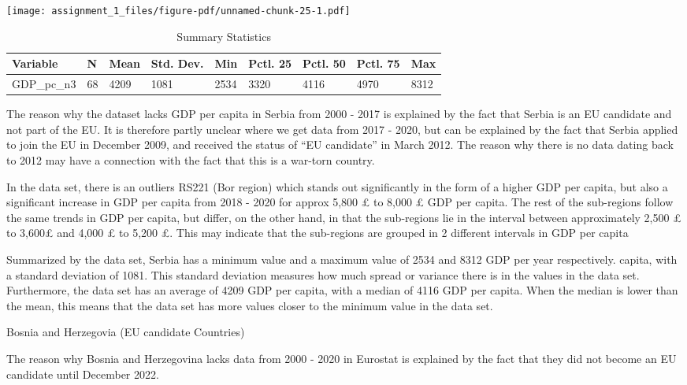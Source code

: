 \documentclass[
  letterpaper,
  DIV=11,
  numbers=noendperiod]{scrartcl}
\begin{document}
\texttt{[image: assignment\_1\_files/figure-pdf/unnamed-chunk-25-1.pdf]}

\begin{table}

\caption{Summary Statistics}
\centering
\begin{tabular}[t]{lllllllll}
\toprule
Variable & N & Mean & Std. Dev. & Min & Pctl. 25 & Pctl. 50 & Pctl. 75 & Max\\
\midrule
GDP_pc_n3 & 68 & 4209 & 1081 & 2534 & 3320 & 4116 & 4970 & 8312\\
\bottomrule
\end{tabular}
\end{table}

The reason why the dataset lacks GDP per capita in Serbia from 2000 -
2017 is explained by the fact that Serbia is an EU candidate and not
part of the EU. It is therefore partly unclear where we get data from
2017 - 2020, but can be explained by the fact that Serbia applied to
join the EU in December 2009, and received the status of ``EU
candidate'' in March 2012. The reason why there is no data dating back
to 2012 may have a connection with the fact that this is a war-torn
country.

In the data set, there is an outliers RS221 (Bor region) which stands
out significantly in the form of a higher GDP per capita, but also a
significant increase in GDP per capita from 2018 - 2020 for approx 5,800
£ to 8,000 £ GDP per capita. The rest of the sub-regions follow the same
trends in GDP per capita, but differ, on the other hand, in that the
sub-regions lie in the interval between approximately 2,500 £ to 3,600£
and 4,000 £ to 5,200 £. This may indicate that the sub-regions are
grouped in 2 different intervals in GDP per capita

Summarized by the data set, Serbia has a minimum value and a maximum
value of 2534 and 8312 GDP per year respectively. capita, with a
standard deviation of 1081. This standard deviation measures how much
spread or variance there is in the values in the data set. Furthermore,
the data set has an average of 4209 GDP per capita, with a median of
4116 GDP per capita. When the median is lower than the mean, this means
that the data set has more values closer to the minimum value in the
data set.

Bosnia and Herzegovia (EU candidate Countries)

The reason why Bosnia and Herzegovina lacks data from 2000 - 2020 in
Eurostat is explained by the fact that they did not become an EU
candidate until December 2022.
\end{document}
